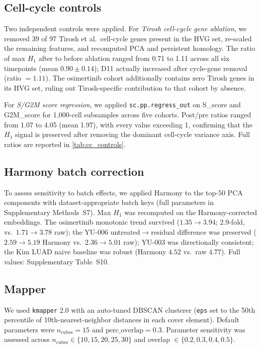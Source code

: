 \subsection*{Cell-cycle controls}

Two independent controls were applied. For \emph{Tirosh cell-cycle gene
ablation}, we removed 39 of 97 Tirosh et al.\ cell-cycle genes
\citep{tirosh2016} present in the HVG set, re-scaled the remaining
features, and recomputed PCA and persistent homology. The ratio of max
$H_1$ after to before ablation ranged from 0.71 to 1.11 across all six
timepoints (mean $0.90 \pm 0.14$); D11 actually increased after
cycle-gene removal (ratio $= 1.11$). The osimertinib cohort additionally
contains zero Tirosh genes in its HVG set, ruling out Tirosh-specific
contribution to that cohort by absence.

For \emph{S/G2M score regression}, we applied
\texttt{sc.pp.regress\_out} on S\_score and G2M\_score for 1{,}000-cell
subsamples across five cohorts. Post/pre ratios ranged from 1.07 to
4.05 (mean 1.97), with every value exceeding 1, confirming that the
$H_1$ signal is preserved after removing the dominant cell-cycle
variance axis. Full ratios are reported in \cref{tab:cc_controls}.

\subsection*{Harmony batch correction}

To assess sensitivity to batch effects, we applied Harmony
\citep{korsunsky2019} to the top-50 PCA components with
dataset-appropriate batch keys (full parameters in Supplementary
Methods~S7). Max $H_1$ was recomputed on the Harmony-corrected
embeddings. The osimertinib monotonic trend survived ($1.35 \to 3.94$;
2.9-fold, vs.\ $1.71 \to 3.78$ raw); the YU-006
untreated$\to$residual difference was preserved ($2.59 \to 5.19$
Harmony vs.\ $2.36 \to 5.01$ raw); YU-003 was directionally consistent;
the Kim LUAD naive baseline was robust (Harmony $4.52$ vs.\ raw
$4.77$). Full values: Supplementary Table~S10.

\subsection*{Mapper}

We used \texttt{kmapper} 2.0 \citep{vanveen2019} with an auto-tuned DBSCAN clusterer
(\texttt{eps} set to the 50th percentile of 10th-nearest-neighbor
distances in each cover element). Default parameters were
$n_{\text{cubes}} = 15$ and $\text{perc\_overlap} = 0.3$. Parameter
sensitivity was assessed across
$n_{\text{cubes}} \in \{10, 15, 20, 25, 30\}$ and overlap $\in \{0.2,
0.3, 0.4, 0.5\}$.

